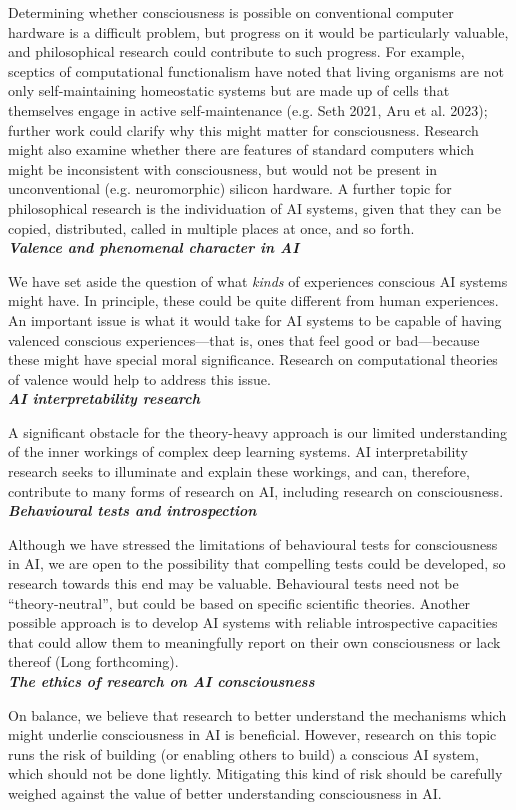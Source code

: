 \documentclass[12pt]{article}
\newcommand{\infopar}{\\[5pt]}
\begin{document}
\begin{infobox} 
Determining whether consciousness is possible on conventional computer hardware is a difficult problem, but progress on it would be particularly valuable, and philosophical research could contribute to such progress. For example, sceptics of computational functionalism have noted that living organisms are not only self-maintaining homeostatic systems but are made up of cells that themselves engage in active self-maintenance (e.g. Seth 2021, Aru et al. 2023); further work could clarify why this might matter for consciousness. Research might also examine whether there are features of standard computers which might be inconsistent with consciousness, but would not be present in unconventional (e.g. neuromorphic) silicon hardware. A further topic for philosophical research is the individuation of AI systems, given that they can be copied, distributed, called in multiple places at once, and so forth.
\infopar
\textbf{\textit{Valence and phenomenal character in AI}}

We have set aside the question of what \textit{kinds} of experiences conscious AI systems might have. In principle, these could be quite different from human experiences. An important issue is what it would take for AI systems to be capable of having valenced conscious experiences—that is, ones that feel good or bad—because these might have special moral significance. Research on computational theories of valence would help to address this issue.
\infopar
\textbf{\textit{AI interpretability research}}

A significant obstacle for the theory-heavy approach is our limited understanding of the inner workings of complex deep learning systems. AI interpretability research seeks to illuminate and explain these workings, and can, therefore, contribute to many forms of research on AI, including research on consciousness.
\infopar
\textbf{\textit{Behavioural tests and introspection}}

Although we have stressed the limitations of behavioural tests for consciousness in AI, we are open to the possibility that compelling tests could be developed, so research towards this end may be valuable. Behavioural tests need not be ``theory-neutral'', but could be based on specific scientific theories. Another possible approach is to develop AI systems with reliable introspective capacities that could allow them to meaningfully report on their own consciousness or lack thereof (Long forthcoming).
\infopar
\textbf{\textit{The ethics of research on AI consciousness}}

On balance, we believe that research to better understand the mechanisms which might underlie consciousness in AI is beneficial. However, research on this topic runs the risk of building (or enabling others to build) a conscious AI system, which should not be done lightly. Mitigating this kind of risk should be carefully weighed against the value of better understanding consciousness in AI.

\end{infobox}
\end{document}
